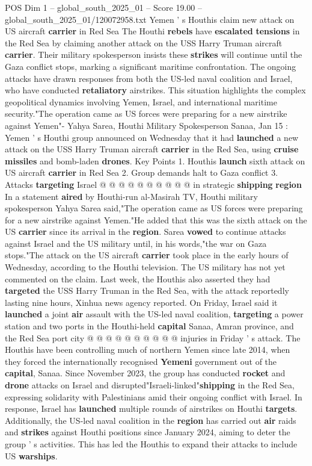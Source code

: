 \begin{textsample}{POS Dim 1 – global\_south\_2025\_01 – Score 19.00 – global\_south\_2025\_01/120072958.txt}  \label{ex:f1_pos_307}
Yemen ' s Houthis claim new attack on US aircraft \textbf{carrier} in Red Sea The Houthi \textbf{rebels} have \textbf{escalated} \textbf{tensions} in the Red Sea by claiming another attack on the USS Harry Truman aircraft \textbf{carrier}.
Their military spokesperson insists these \textbf{strikes} will continue until the Gaza conflict stops, marking a significant maritime confrontation.
The ongoing attacks have drawn responses from both the US-led naval coalition and Israel, who have conducted \textbf{retaliatory} airstrikes.
This situation highlights the complex geopolitical dynamics involving Yemen, Israel, and international maritime security."The operation came as US forces were preparing for a new airstrike against Yemen"- Yahya Sarea, Houthi Military Spokesperson Sanaa, Jan 15 : Yemen ' s Houthi group announced on Wednesday that it had \textbf{launched} a new attack on the USS Harry Truman aircraft \textbf{carrier} in the Red Sea, using \textbf{cruise} \textbf{missiles} and bomb-laden \textbf{drones}.
Key Points 1.
Houthis \textbf{launch} sixth attack on US aircraft \textbf{carrier} in Red Sea 2.
Group demands halt to Gaza conflict 3.
Attacks \textbf{targeting} Israel @ @ @ @ @ @ @ @ @ @ in strategic \textbf{shipping} \textbf{region} In a statement \textbf{aired} by Houthi-run al-Masirah TV, Houthi military spokesperson Yahya Sarea said,"The operation came as US forces were preparing for a new airstrike against Yemen."He added that this was the sixth attack on the US \textbf{carrier} since its arrival in the \textbf{region}.
Sarea \textbf{vowed} to continue attacks against Israel and the US military until, in his words,"the war on Gaza stops."The attack on the US aircraft \textbf{carrier} took place in the early hours of Wednesday, according to the Houthi television.
The US military has not yet commented on the claim.
Last week, the Houthis also asserted they had \textbf{targeted} the USS Harry Truman in the Red Sea, with the attack reportedly lasting nine hours, Xinhua news agency reported.
On Friday, Israel said it \textbf{launched} a joint \textbf{air} assault with the US-led naval coalition, \textbf{targeting} a power station and two ports in the Houthi-held \textbf{capital} Sanaa, Amran province, and the Red Sea port city @ @ @ @ @ @ @ @ @ @ injuries in Friday ' s attack.
The Houthis have been controlling much of northern Yemen since late 2014, when they forced the internationally recognised \textbf{Yemeni} government out of the \textbf{capital}, Sanaa.
Since November 2023, the group has conducted \textbf{rocket} and \textbf{drone} attacks on Israel and disrupted"Israeli-linked"\textbf{shipping} in the Red Sea, expressing solidarity with Palestinians amid their ongoing conflict with Israel.
In response, Israel has \textbf{launched} multiple rounds of airstrikes on Houthi \textbf{targets}.
Additionally, the US-led naval coalition in the \textbf{region} has carried out \textbf{air} raids and \textbf{strikes} against Houthi positions since January 2024, aiming to deter the group ' s activities.
This has led the Houthis to expand their attacks to include US \textbf{warships}.


\end{textsample}
